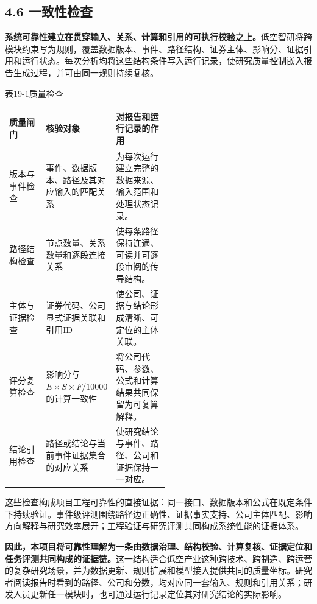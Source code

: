 \subsection*{4.6 一致性检查}\label{page:19}
\noindent\textbf{系统可靠性建立在贯穿输入、关系、计算和引用的可执行校验之上。}低空智研将跨模块约束写为规则，覆盖数据版本、事件、路径结构、证券主体、影响分、证据引用和运行状态。每次分析均将这些结构条件写入运行记录，使研究质量控制嵌入报告生成过程，并可由同一规则持续复核\cite{lhy-contracts,lhy-orchestrator}。

\begin{center}\small 表19-1\quad 质量检查\par\vspace{1mm}
\begin{tabularx}{\linewidth}{p{0.23\linewidth}p{0.29\linewidth}X}
\toprule
质量闸门 & 核验对象 & 对报告和运行记录的作用\\
\midrule
版本与事件检查 & 事件、数据版本、路径及其对应输入的匹配关系 & 为每次运行建立完整的数据来源、输入范围和处理状态记录。\\
路径结构检查 & 节点数量、关系数量和逐段连接关系 & 使每条路径保持连通、可读并可逐段审阅的传导结构。\\
主体与证据检查 & 证券代码、公司显式证据关联和引用ID & 使公司、证据与结论形成清晰、可定位的主体关联。\\
评分复算检查 & 影响分与$E\times S\times F/10000$的计算一致性 & 将公司代码、参数、公式和计算结果共同保留为可复算解释。\\
结论引用检查 & 路径或结论与当前事件证据集合的对应关系 & 使研究结论与事件、路径、公司和证据保持一一对应。\\
\bottomrule
\end{tabularx}\end{center}

这些检查构成项目工程可靠性的直接证据：同一接口、数据版本和公式在既定条件下持续验证。事件级评测围绕路径边正确性、证据事实支持、公司主体匹配、影响方向解释与研究效率展开；工程验证与研究评测共同构成系统性能的证据体系。

\noindent\textbf{因此，本项目将可靠性理解为一条由数据治理、结构校验、计算复核、证据定位和任务评测共同构成的证据链。}这一结构适合低空产业这种跨技术、跨制造、跨运营的复杂研究场景，并为数据更新、规则扩展和模型接入提供共同的质量坐标。研究者阅读报告时看到的路径、公司和分数，均对应同一套输入、规则和引用关系；研发人员更新任一模块时，也可通过运行记录定位其对研究结论的实际影响。


